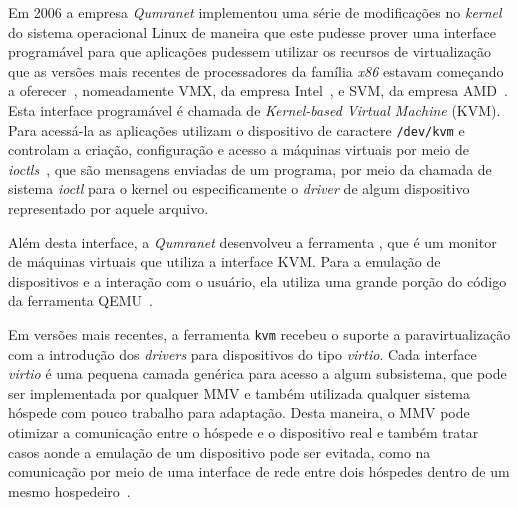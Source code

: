 Em 2006 a empresa \emph{Qumranet} implementou uma série de modificações no
\emph{kernel} do sistema operacional Linux de maneira que este pudesse prover
uma interface programável para que aplicações pudessem utilizar os recursos de
virtualização que as versões mais recentes de processadores da família
\emph{x86} estavam começando a oferecer~\cite{kerneltrap2007avi}, nomeadamente
VMX, da empresa Intel~\cite{uhlig2005intel}, e SVM, da empresa
AMD~\cite{strongin2005trusted}.  Esta interface programável é chamada de
\emph{Kernel-based Virtual Machine} (KVM). Para acessá-la as aplicações
utilizam o dispositivo de caractere \texttt{/dev/kvm} e controlam a criação,
configuração e acesso a máquinas virtuais por meio de
\emph{ioctls}~\cite{kivity2007kvm}, que são mensagens enviadas de um programa,
por meio da chamada de sistema \emph{ioctl} para o kernel ou especificamente o
\emph{driver} de algum dispositivo representado por aquele arquivo.

Além desta interface, a \emph{Qumranet} desenvolveu a ferramenta ,
que é um monitor de máquinas virtuais que utiliza a interface KVM. Para a
emulação de dispositivos e a interação com o usuário, ela utiliza uma grande
porção do código da ferramenta QEMU~\cite{kerneltrap2007avi}.

Em versões mais recentes, a ferramenta \texttt{kvm} recebeu o suporte a
paravirtualização com a introdução dos \emph{drivers} para dispositivos do tipo
\emph{virtio}. Cada interface \emph{virtio} é uma pequena camada genérica para
acesso a algum subsistema, que pode ser implementada por qualquer MMV e também
utilizada qualquer sistema hóspede com pouco trabalho para adaptação. Desta
maneira, o MMV pode otimizar a comunicação entre o hóspede e o dispositivo real
e também tratar casos aonde a emulação de um dispositivo pode ser evitada, como
na comunicação por meio de uma interface de rede entre dois hóspedes dentro de
um mesmo hospedeiro~\cite{russell2008virtio}.




\subsection{\libvirt}\label{sec:libvirt}


